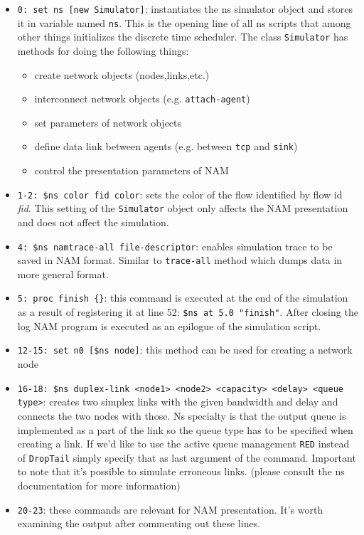 \documentclass[a4paper]{article}
\begin{document}
\begin{itemize}

    \item \verb!0: set ns [new Simulator]!: instantiates the ns simulator object and stores it in variable named
          \verb!ns!. This is the opening line of all ns scripts that among other things initializes the discrete
          time scheduler. The class \verb!Simulator! has methods for doing the following things:

          \begin{itemize}
              \item create network objects (nodes,links,etc.)
              \item interconnect network objects (e.g. \verb!attach-agent!)
              \item set parameters of network objects
              \item define data link between agents (e.g. between \verb!tcp! and \verb!sink!)
              \item control the presentation parameters of NAM
          \end{itemize}

    \item \verb!1-2: $ns color fid color!: sets the color of the flow identified by flow id \emph{fid}. This setting of the
          \verb!Simulator! object only affects the NAM presentation and does not affect the simulation.

    \item \verb!4: $ns namtrace-all file-descriptor!: enables simulation trace to be saved in NAM format. Similar to \verb!trace-all!
          method which dumps data in more general format.

    \item \verb!5: proc finish {}!: this command is executed at the end of the simulation as a result of registering it at
          line 52: \verb!$ns at 5.0 "finish"!. After closing the log NAM program is executed as an epilogue of the simulation
          script.

    \item \verb!12-15: set n0 [$ns node]!: this method can be used for creating a network node

    \item \verb!16-18: $ns duplex-link <node1> <node2> <capacity> <delay> <queue type>!: creates two simplex links with the given bandwidth and delay and connects the two nodes
          with those. Ns specialty is that the output queue is implemented as a part of the link so the queue type has to be
          specified when creating a link. If we'd like to use the active queue management \verb!RED! instead of
          \verb!DropTail! simply specify that as last argument of the command. Important to note that it's possible to
          simulate erroneous links. (please consult the ns documentation for more information)

    \item \verb!20-23!: these commands are relevant for NAM presentation. It's worth examining the output after
          commenting out these lines.

\end{itemize}
\end{document}
